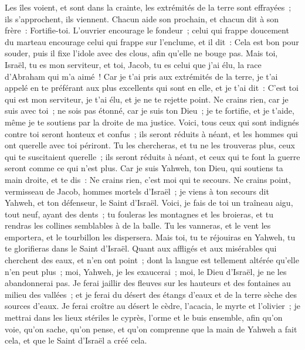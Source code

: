 \begin{multicols}{2}
Les îles voient, et sont dans la crainte, les extrémités de la terre sont effrayées~; ils s'approchent, ils viennent.
Chacun aide son prochain, et chacun dit à son frère~: Fortifie-toi.
L'ouvrier encourage le fondeur~; celui qui frappe doucement du marteau encourage celui qui frappe sur l'enclume, et il dit~: Cela est bon pour souder, puis il fixe l'idole avec des clous, afin qu'elle ne bouge pas.
Mais toi, Israël, tu es mon serviteur, et toi, Jacob, tu es celui que j'ai élu, la race d'Abraham qui m'a aimé~!
Car je t'ai pris aux extrémités de la terre, je t'ai appelé en te préférant aux plus excellents qui sont en elle, et je t'ai dit~: C'est toi qui est mon serviteur, je t'ai élu, et je ne te rejette point.
Ne crains rien, car je suis avec toi~; ne sois pas étonné, car je suis ton Dieu~; je te fortifie, et je t'aide, même je te soutiens par la droite de ma justice.
Voici, tous ceux qui sont indignés contre toi seront honteux et confus~; ils seront réduits à néant, et les hommes qui ont querelle avec toi périront.
Tu les chercheras, et tu ne les trouveras plus, ceux qui te suscitaient querelle~; ils seront réduits à néant, et ceux qui te font la guerre seront comme ce qui n'est plus.
Car je suis Yahweh, ton Dieu, qui soutiens ta main droite, et te dis~: Ne crains rien, c'est moi qui te secours.
Ne crains point, vermisseau de Jacob, hommes mortels d'Israël~; je viens à ton secours dit Yahweh, et ton défenseur, le Saint d'Israël.
Voici, je fais de toi un traîneau aigu, tout neuf, ayant des dents~; tu fouleras les montagnes et les broieras, et tu rendras les collines semblables à de la balle.
Tu les vanneras, et le vent les emportera, et le tourbillon les dispersera. Mais toi, tu te réjouiras en Yahweh, tu te glorifieras dans le Saint d'Israël.
Quant aux affligés et aux misérables qui cherchent des eaux, et n'en ont point~; dont la langue est tellement altérée qu'elle n'en peut plus~; moi, Yahweh, je les exaucerai~; moi, le Dieu d'Israël, je ne les abandonnerai pas.
Je ferai jaillir des fleuves sur les hauteurs et des fontaines au milieu des vallées~; et je ferai du désert des étangs d'eaux et de la terre sèche des sources d'eaux.
Je ferai croître au désert le cèdre, l'acacia, le myrte et l'olivier~; je mettrai dans les lieux stériles le cyprès, l'orme et le buis ensemble,
afin qu'on voie, qu'on sache, qu'on pense, et qu'on comprenne que la main de Yahweh a fait cela, et que le Saint d'Israël a créé cela.

\end{multicols}
